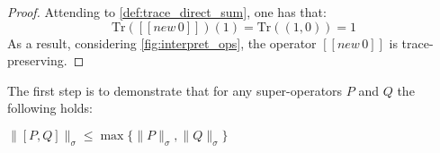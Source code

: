 \begin{proof}
Attending to \autoref{def:trace_direct_sum}, one has that:
\begin{equation}
  \text{Tr}\left([\![\textit{new} \, 0 ]\!]\right) (1) = \text{Tr}((1,0)) = 1
\end{equation}
As a result, considering \autoref{fig:interpret_ops}, the operator $[\![\textit{new} \, 0 ]\!]$ is trace-preserving.


\end{proof}
  

  The first step is to demonstrate that for any super-operators $P$ and $Q$ the following holds:
\begin{lemma}\label{lem1}
  $\lVert [P,Q] \rVert_{\sigma} \leq \max \{ \lVert P \rVert_{\sigma}, \lVert Q \rVert_{\sigma} \}$
\end{lemma}



